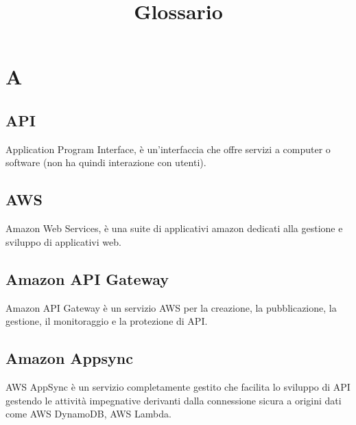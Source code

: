 \documentclass{classes/base}
\title{Glossario}
\author{\giulio}
\begin{document}
	\maketitle
	\newpage
	\tableofcontents
	

    \section*{A}
        \subsection*{API}
        Application Program Interface, è un'interfaccia che offre servizi a computer o software (non ha quindi interazione con utenti).
       
        \subsection*{AWS}
        Amazon Web Services, è una suite di applicativi amazon dedicati alla gestione e sviluppo di applicativi web.

        \subsection*{Amazon API Gateway}
        Amazon API Gateway è un servizio AWS per la creazione, la pubblicazione, la gestione, il monitoraggio e la protezione di API.

        \subsection*{Amazon Appsync}
        AWS AppSync è un servizio completamente gestito che facilita lo sviluppo di API gestendo le attività impegnative derivanti dalla connessione sicura a origini dati come AWS DynamoDB, AWS Lambda.
\end{document}
